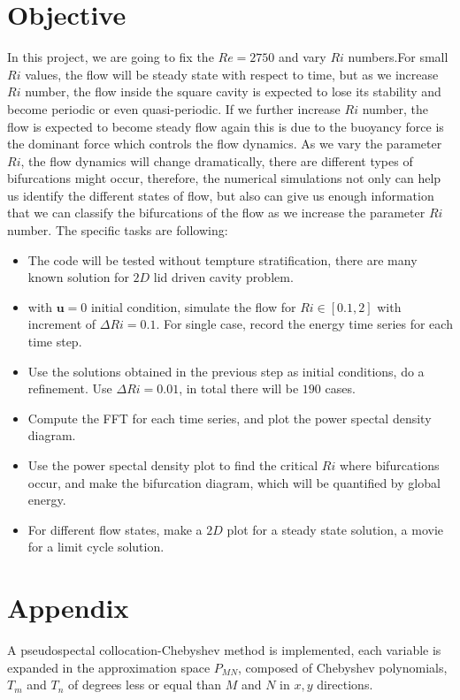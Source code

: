 \documentclass[12pt]{article}
\newcommand{\Rey}{\mathit{Re}}
\begin{document}
\section{Objective}
In this project, we are going to fix the $\Rey = 2750$ and vary $Ri$
numbers.For small $Ri$ values, the flow will be steady state with
respect to time, but as we increase $Ri$ number, the flow inside the square cavity
is expected to lose its stability and become periodic or even
quasi-periodic. If we further increase $Ri$ number, the flow is expected
to become steady flow again this is due to the buoyancy force is the
dominant force which controls the flow dynamics. As we vary the
parameter $Ri$, the flow dynamics will change dramatically, there are
different types of bifurcations might occur, therefore, the numerical 
simulations not only can help us identify the different states of flow, 
but also can give us enough information that we can classify the bifurcations of the
flow as we increase the parameter $Ri$ number. The specific tasks are
following:
\begin{itemize}
\item{The code will be tested without tempture stratification, there are 
  many known solution for $2D$ lid driven cavity problem.}
\item{with $\bm{u}=0$ initial condition, simulate the flow for $Ri\in
  [0.1,2]$ with increment of $\Delta Ri=0.1$. For single case, record
  the energy time series for each time step.} 
\item{Use the solutions obtained in the previous step as initial
  conditions, do a refinement. Use $\Delta Ri=0.01$, in total there will
  be $190$ cases.}
\item{Compute the FFT for each time series, and plot the power spectal
  density diagram.}
\item{Use the power spectal density plot to find the critical $Ri$ where 
  bifurcations occur, and make the bifurcation diagram, which will be
  quantified by global energy.}
\item{For different flow states, make a $2D$ plot for a steady state
  solution, a movie for a limit cycle solution.}
\end{itemize}

\section{Appendix}
A pseudospectal collocation-Chebyshev method is implemented, each variable is expanded 
in the approximation space $P_{MN}$, composed of Chebyshev polynomials, 
$T_{m}$ and $T_{n}$ of degrees less or equal than $M$ and $N$ in $x, y$ directions.
\end{document}
